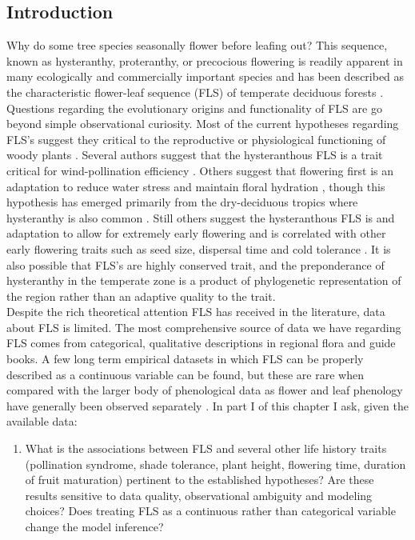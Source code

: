 \documentclass{article}\usepackage[]{graphicx}\usepackage[]{color}
\begin{document}
\subsection*{Introduction}
\indent\indent Why do some tree species seasonally flower before leafing out? This sequence, known as hysteranthy, proteranthy, or precocious flowering is readily apparent in many ecologically and commercially important species and has been described as  the characteristic flower-leaf sequence (FLS) of temperate deciduous forests \citep{Rathcke1985}. Questions regarding the evolutionary origins and functionality of FLS are go beyond simple observational curiosity. Most of the current hypotheses regarding FLS's suggest they critical to the reproductive or physiological functioning of woody plants \citep{Gougherty2018}. Several authors suggest that the hysteranthous FLS is a trait critical for wind-pollination efficiency \citep{Whitehead1969,Friedman2009}. Others suggest that flowering first is an adaptation to reduce water stress and maintain floral hydration \citep{Franklin2016}, though this hypothesis has emerged primarily from the dry-deciduous tropics where hysteranthy is also common \citep{Janzen1967,Franklin2016}.  Still others suggest the hysteranthous FLS is and adaptation to allow for extremely early flowering and is correlated with other early flowering traits such as seed size, dispersal time and cold tolerance \citep{Gougherty2018,Bolmgren2003,Primack1987}. It is also possible that FLS's are highly conserved trait, and the preponderance of hysteranthy in the temperate zone is a product of phylogenetic representation of the region rather than an adaptive quality to the trait.\\
\indent Despite the rich theoretical attention FLS has received in the literature, data about FLS is limited. The most comprehensive source of data we have regarding FLS comes from categorical, qualitative descriptions in regional flora and guide books. A few long term empirical datasets in which FLS can be properly described as a continuous variable can be found, but these are rare when compared with the larger body of phenological data as flower and leaf phenology have generally been observed separately \citep{Wolkovich2014}. In part I of this chapter I ask, given the available data:
\begin{enumerate}
\item  What is the associations between FLS and several other life history traits (pollination syndrome, shade tolerance, plant height, flowering time, duration of fruit maturation) pertinent to the established hypotheses? Are these results sensitive to data quality, observational ambiguity and modeling choices? Does treating FLS as a continuous rather than categorical variable change the model inference?
\end{enumerate}
\end{document}
